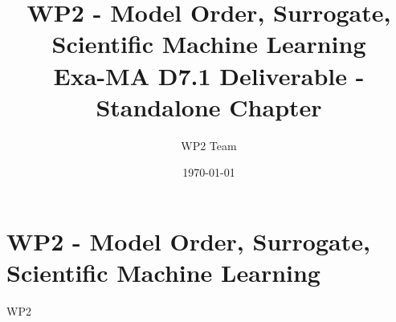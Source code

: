 \documentclass[11pt]{report}
\begin{document}
\title{WP2 - Model Order, Surrogate, Scientific Machine Learning\\
\large Exa-MA D7.1 Deliverable - Standalone Chapter}
\author{WP2 Team}
\date{\today}
\maketitle

\tableofcontents
\clearpage

\chapter{WP2 - Model Order, Surrogate, Scientific Machine Learning}
\label{chap:wp2}

{WP2}

\clearpage


\end{document}
